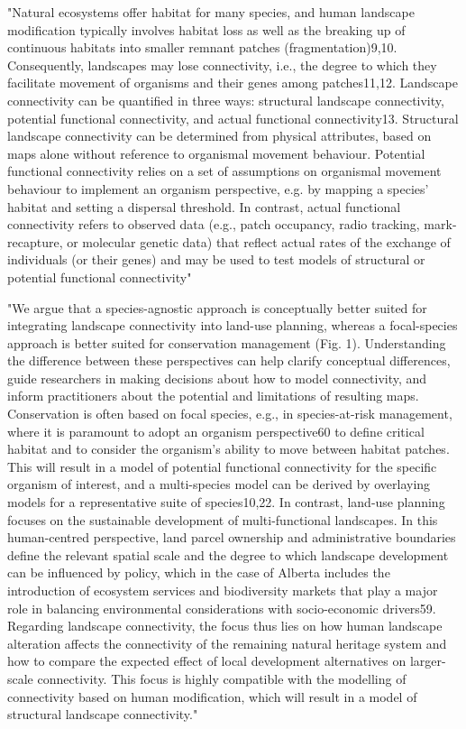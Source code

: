 \documentclass[
]{book}
\newenvironment{Shaded}{\begin{snugshade}}{\end{snugshade}}
\newcommand{\StringTok}[1]{\textcolor[rgb]{0.31,0.60,0.02}{#1}}
\begin{document}
\begin{Shaded}
\begin{Highlighting}[]
\StringTok{"Natural ecosystems offer habitat for many species, and human landscape modification typically involves habitat loss as well as the breaking up of continuous habitats into smaller remnant patches (fragmentation)9,10. Consequently, landscapes may lose connectivity, i.e., the degree to which they facilitate movement of organisms and their genes among patches11,12. Landscape connectivity can be quantified in three ways: structural landscape connectivity, potential functional connectivity, and actual functional connectivity13. Structural landscape connectivity can be determined from physical attributes, based on maps alone without reference to organismal movement behaviour. Potential functional connectivity relies on a set of assumptions on organismal movement behaviour to implement an organism perspective, e.g. by mapping a species’ habitat and setting a dispersal threshold. In contrast, actual functional connectivity refers to observed data (e.g., patch occupancy, radio tracking, mark{-}recapture, or molecular genetic data) that reflect actual rates of the exchange of individuals (or their genes) and may be used to test models of structural or potential functional connectivity"}

\StringTok{"We argue that a species{-}agnostic approach is conceptually better suited for integrating landscape connectivity into land{-}use planning, whereas a focal{-}species approach is better suited for conservation management (Fig. 1). Understanding the difference between these perspectives can help clarify conceptual differences, guide researchers in making decisions about how to model connectivity, and inform practitioners about the potential and limitations of resulting maps. Conservation is often based on focal species, e.g., in species{-}at{-}risk management, where it is paramount to adopt an organism perspective60 to define critical habitat and to consider the organism’s ability to move between habitat patches. This will result in a model of potential functional connectivity for the specific organism of interest, and a multi{-}species model can be derived by overlaying models for a representative suite of species10,22. In contrast, land{-}use planning focuses on the sustainable development of multi{-}functional landscapes. In this human{-}centred perspective, land parcel ownership and administrative boundaries define the relevant spatial scale and the degree to which landscape development can be influenced by policy, which in the case of Alberta includes the introduction of ecosystem services and biodiversity markets that play a major role in balancing environmental considerations with socio{-}economic drivers59. Regarding landscape connectivity, the focus thus lies on how human landscape alteration affects the connectivity of the remaining natural heritage system and how to compare the expected effect of local development alternatives on larger{-}scale connectivity. This focus is highly compatible with the modelling of connectivity based on human modification, which will result in a model of structural landscape connectivity."}
\end{Highlighting}
\end{Shaded}
\end{document}
